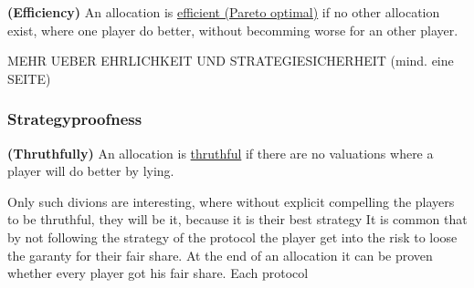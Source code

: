 \begin{defi}{\textbf{(Efficiency)}}
\newline An allocation is \underline{efficient (Pareto optimal)} if no other allocation exist, where one player do better, without becomming worse for an other player.
\end{defi}
\newpage
MEHR UEBER EHRLICHKEIT UND STRATEGIESICHERHEIT (mind. eine SEITE)
\subsubsection{Strategyproofness}

\begin{defi}{\textbf{(Thruthfully)}}
An allocation is \underline{thruthful} if there are no valuations where a player will do better
by lying.
\end{defi}
Only such divions are interesting, where without explicit compelling the
players to be thruthful, they will be it, because it is their best strategy
It is common that by not following the strategy of the protocol the player get into the risk to loose the garanty for their fair share. At the end of an allocation it can be proven whether every player got his fair share. 
Each protocol 

